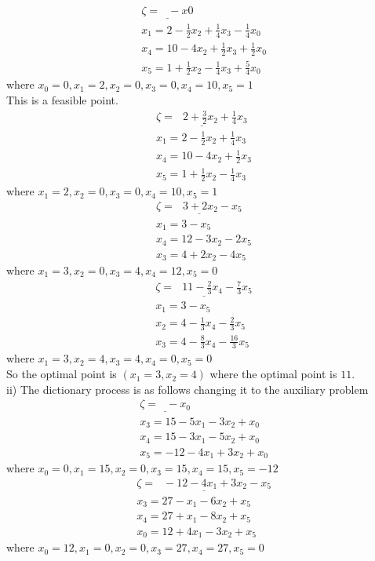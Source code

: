 \documentclass[11.5pt, letterpaper, bibtotoc,
    tablecaptionabove, figurecaptionabove]{article}
\begin{document}
\begin{align*}
	\underline{\zeta = \:\:\: -x0}\\
	x_1 = 2 - \frac{1}{2}x_2 + \frac{1}{4}x_3 - \frac{1}{4}x_0 \\
	x_4 = 10 - 4x_2 + \frac{1}{2}x_3 +\frac{1}{2} x_0 \\
	x_5 = 1 + \frac{1}{2}x_2 - \frac{1}{4}x_3 + \frac{5}{4}x_0 
\end{align*}
where $x_0 = 0, x_1 = 2, x_2 = 0, x_3 = 0, x_4 = 10, x_5 = 1$   \\
This is a feasible point.
\begin{align*}
	\underline{\zeta = \:\:\: 2 + \frac{3}{2}x_2  + \frac{1}{4}x_3}\\
	x_1 = 2 - \frac{1}{2}x_2 + \frac{1}{4}x_3 \\
	x_4 = 10 - 4x_2 + \frac{1}{2}x_3  \\
	x_5 = 1 + \frac{1}{2}x_2 - \frac{1}{4}x_3 
\end{align*}
where $ x_1 = 2, x_2 = 0, x_3 = 0, x_4 = 10, x_5 = 1$   \\

\begin{align*}
	\underline{\zeta = \:\:\: 3 + 2x_2 - x_5}\\
	x_1 = 3 - x_5\\
	x_4 = 12 - 3x_2 - 2x_5\\
	x_3 = 4 + 2x_2 - 4x_5
\end{align*}
where $x_1 = 3, x_2 = 0, x_3 = 4, x_4 = 12, x_5 = 0$   \\

\begin{align*}
	\underline{\zeta = \:\:\: 11 - \frac{2}{3}x_4 - \frac{7}{3}x_5}\\
	x_1 = 3 - x_5\\
	x_2 = 4 - \frac{1}{3}x_4 - \frac{2}{3}x_5 \\
	x_3 = 4 - \frac{8}{3}x_4 - \frac{16}{3}x_5
\end{align*}
where $ x_1 = 3, x_2 = 4, x_3 = 4, x_4 = 0, x_5 = 0$   \\
So the optimal point is $(x_1 = 3, x_2 = 4)$ where the optimal point is $11$.  \\
ii)
The dictionary  process is as follows changing it to the auxiliary problem
\begin{align*}
	\underline{\zeta = \:\:\: -x_0}\\
	x_3 = 15 - 5x_1 - 3x_2 + x_0\\
	x_4 = 15 - 3x_1 - 5x_2 + x_0 \\
	x_5 = -12 - 4x_1 + 3x_2 + x_0
\end{align*}
where $x_0 = 0, x_1 = 15, x_2 = 0, x_3 = 15, x_4 = 15, x_5 = -12$   \\
\begin{align*}
	\underline{\zeta = \:\:\: -12 - 4x_1 + 3x_2 - x_5}\\
	x_3 = 27 - x_1 - 6x_2 + x_5\\
	x_4 = 27 + x_1 - 8x_2 + x_5 \\
	x_0 = 12 + 4x_1 - 3x_2 + x_5
\end{align*}
where $x_0 = 12, x_1 = 0, x_2 = 0, x_3 = 27, x_4 = 27, x_5 = 0$   \\
\end{document}
